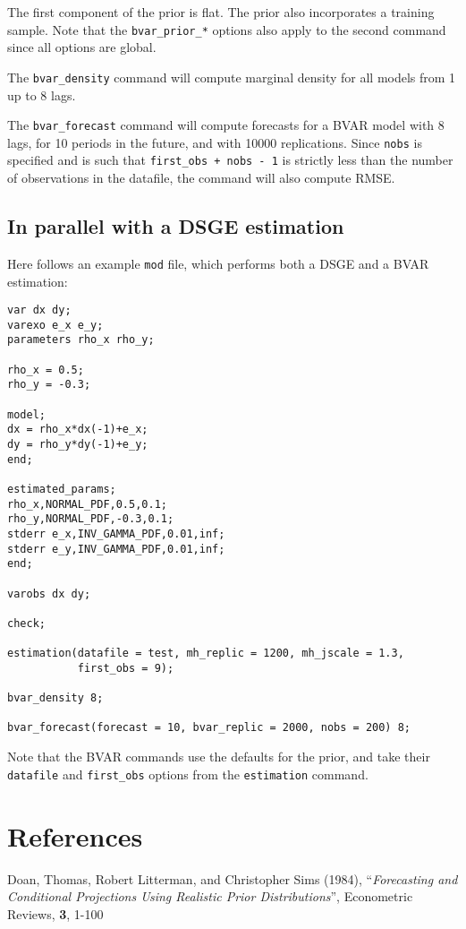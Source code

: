 \documentclass[10pt,a4paper]{article}
\begin{document}
The first component of the prior is flat. The prior also incorporates a training sample. Note that the \texttt{bvar\_prior\_*} options also apply to the second command since all options are global.

The \texttt{bvar\_density} command will compute marginal density for all models from 1 up to 8 lags.

The \texttt{bvar\_forecast} command will compute forecasts for a BVAR model with 8 lags, for 10 periods in the future, and with 10000 replications. Since \texttt{nobs} is specified and is such that \texttt{first\_obs + nobs - 1} is strictly less than the number of observations in the datafile, the command will also compute RMSE.

\subsection{In parallel with a DSGE estimation}

Here follows an example \texttt{mod} file, which performs both a DSGE and a BVAR estimation:

\begin{verbatim}
var dx dy;
varexo e_x e_y;
parameters rho_x rho_y;

rho_x = 0.5;
rho_y = -0.3;

model;
dx = rho_x*dx(-1)+e_x;
dy = rho_y*dy(-1)+e_y;
end;

estimated_params;
rho_x,NORMAL_PDF,0.5,0.1;
rho_y,NORMAL_PDF,-0.3,0.1;
stderr e_x,INV_GAMMA_PDF,0.01,inf;
stderr e_y,INV_GAMMA_PDF,0.01,inf;
end;

varobs dx dy;

check;

estimation(datafile = test, mh_replic = 1200, mh_jscale = 1.3,
           first_obs = 9);

bvar_density 8;

bvar_forecast(forecast = 10, bvar_replic = 2000, nobs = 200) 8;
\end{verbatim}

Note that the BVAR commands use the defaults for the prior, and take their \texttt{datafile} and \texttt{first\_obs} options from the \texttt{estimation} command.



\section*{References}

\noindent Doan, Thomas, Robert Litterman, and Christopher Sims (1984), ``\textit{Forecasting and Conditional Projections Using Realistic Prior Distributions}'', Econometric Reviews, \textbf{3}, 1-100
\end{document}
